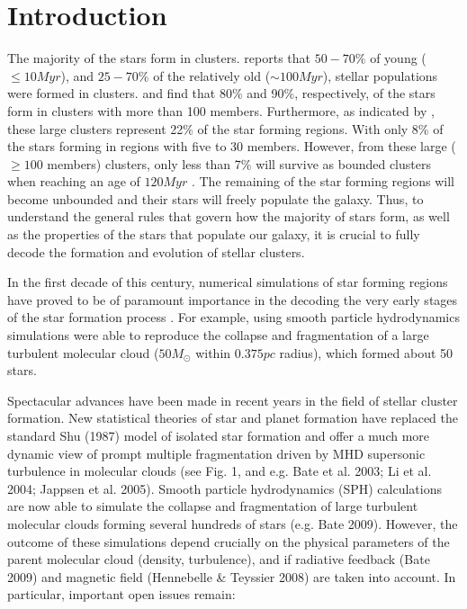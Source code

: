\chapter{Introduction}
\label{chap:introduction}


The majority of the stars form in clusters. \citet{2000AJ....120.3139C} reports that $50-70\%$ of young ($\leq10Myr$), and $25-70\%$ of the relatively old ($\sim100Myr$), stellar populations were formed in clusters. \citet{2003AJ....126.1916P} and \citet{2003ARA&A..41...57L} find that 80\% and 90\%, respectively, of the stars form in clusters with more than 100 members. Furthermore, as indicated by  \citet{2003AJ....126.1916P}, these large clusters represent  22\% of the star forming regions. With only 8\% of the stars forming in regions with five to 30 members. However, from these large ($\geq 100$ members) clusters, only less than 7\% will survive as bounded clusters when reaching an age of $120 Myr$ \citep{2003ARA&A..41...57L}. The remaining of the star forming regions will become unbounded and their stars will freely populate the galaxy. Thus, to understand the general rules that govern how the majority of stars form, as well as the properties of the stars that populate our galaxy, it is crucial to fully decode the formation and evolution of stellar clusters. 

    In the first decade of this century, numerical simulations of star forming regions have proved to be of paramount importance in the decoding the very early stages of the star formation process \citep{2003MNRAS.339..577B; 2004ApJ...605..800L;2005A&A...435..611J,2009MNRAS.392..590B,2009MNRAS.392.1363B,2009MNRAS.397..232B}. For example, \citet{2003MNRAS.339..577B} using smooth particle hydrodynamics simulations were able to reproduce the collapse and fragmentation of a large turbulent molecular cloud ($50 M_{\odot}$ within $0.375pc$ radius), which formed about 50 stars.  

Spectacular advances have been made in recent years in the field of stellar cluster formation. New statistical theories of star and planet formation have replaced the standard Shu (1987) model of isolated star formation and offer a much more dynamic view of prompt multiple fragmentation driven by MHD supersonic turbulence in molecular clouds (see Fig. 1, and e.g. Bate et al. 2003; Li et al. 2004; Jappsen et al. 2005). Smooth particle hydrodynamics (SPH) calculations are now able to simulate the collapse and fragmentation of large turbulent molecular clouds forming several hundreds of stars (e.g. Bate 2009).
However, the outcome of these simulations depend crucially on the physical parameters of the parent molecular cloud (density, turbulence), and if radiative feedback (Bate 2009) and magnetic field (Hennebelle \& Teyssier 2008) are taken into account. In particular, important open issues remain:

